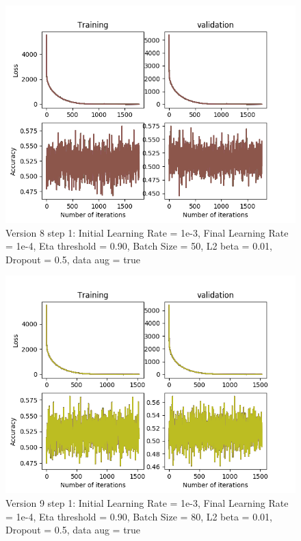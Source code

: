 \documentclass[12pt,reqno]{amsart}
\numberwithin{equation}{section}
\begin{document}
\begin{enumerate}
\begin{figure}[H]
\centering
\includegraphics[scale=0.6]{data_liquid155_version8_step1}
\caption{Version 8 step 1: Initial Learning Rate = 1e-3, Final Learning Rate = 1e-4, Eta threshold = 0.90, Batch Size = 50, L2 beta = 0.01, Dropout = 0.5, data aug = true}
\end{figure}

\begin{figure}[H]
\centering
\includegraphics[scale=0.6]{data_liquid155_version9_step1}
\caption{Version 9 step 1: Initial Learning Rate = 1e-3, Final Learning Rate = 1e-4, Eta threshold = 0.90, Batch Size = 80, L2 beta = 0.01, Dropout = 0.5, data aug = true}
\end{figure}


\end{enumerate}
\end{document}
